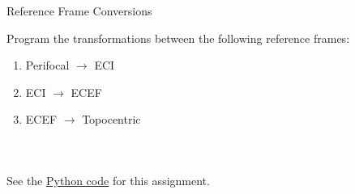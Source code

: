 


%
%

\newcommand{\hmwkTitle}{HW02}
\newcommand{\hmwkSubTitle}{Reference Frames and Ground Tracks}
\newcommand{\hmwkDueDate}{October 11th. 2025}
\newcommand{\hmwkDueTime}{11:59 PM}
\newcommand{\hmwkClass}{ENAE 441 - 0101}
\newcommand{\hmwkClassTime}{09:30 AM}
\newcommand{\hmwkClassInstructor}{Dr. Martin}
\newcommand{\hmwkAuthorName}{\textbf{Vai Srivastava}}
\newcommand{\hmwkCompletionDate}{\today}



\maketitle

\pagebreak

\begin{hwkProblem}{1}{Reference Frame Conversions} \label{hwk:p01}

	Program the transformations between the following reference frames:
	\begin{enumerate}[label=(\alph*)]
		\item \label{hwk:p01a} Perifocal \( \to \) ECI
		\item \label{hwk:p01b} ECI \( \to \) ECEF
		\item \label{hwk:p01c} ECEF \( \to \) Topocentric
	\end{enumerate}

	\hwkSol{} \label{hwk:s01}

	\hwkPart{} \label{hwk:s01a}

	\inputminted{python}{./code/s01a.txt}

	\hwkPart{} \label{hwk:s01b}

	\inputminted{python}{./code/s01b.txt}

	\hwkPart{} \label{hwk:s01c}

	\inputminted{python}{./code/s01c.txt}

	\hwkCode{} \label{code:s01}

	See the \href{https://www.github.com/vaisriv/enae441-hw02/blob/main/code/hw02.py}{Python code} for this assignment.

\end{hwkProblem}

